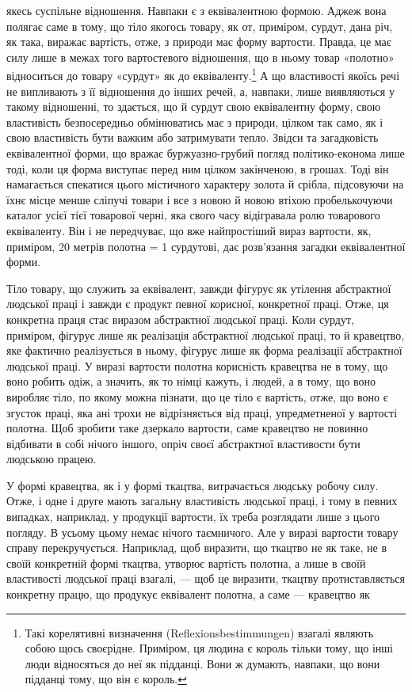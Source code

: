 якесь суспільне відношення. Навпаки є з еквівалентною формою. Аджеж вона полягає саме в тому, що
тіло якогось товару, як от, приміром, сурдут, дана річ, як така, виражає вартість, отже, з природи
має форму вартости. Правда, це має силу лише в межах того вартостевого відношення, що в ньому товар
«полотно» відноситься до товару «сурдут» як до еквіваленту.\footnote{
Такі корелятивні визначення (Reflexionsbestimmungen) взагалі являють собою щось своєрідне.
Приміром, ця людина є король тільки тому, що інші люди відносяться до неї як підданці. Вони ж
думають, навпаки, що вони підданці тому, що він є король.
} А що властивості
якоїсь речі не випливають з її відношення до інших речей, а, навпаки, лише виявляються у такому
відношенні, то здається, що й сурдут свою еквівалентну форму, свою властивість безпосередньо
обмінюватись має з природи, цілком так само, як і свою властивість бути важким або затримувати
тепло. Звідси та загадковість еквівалентної форми, що вражає буржуазно-грубий погляд
політико-економа лише тоді, коли ця форма виступає перед ним цілком закінченою, в грошах. Тоді він
намагається спекатися цього містичного характеру золота й срібла, підсовуючи на їхнє місце менше
сліпучі товари і все з новою й новою втіхою пробелькочуючи каталог усієї тієї товарової черні, яка
свого часу відігравала ролю товарового еквіваленту. Він і не передчуває, що вже найпростіший вираз
вартости, як, приміром, 20 метрів полотна = 1 сурдутові, дає розв’язання загадки еквівалентної
форми.

Тіло товару, що служить за еквівалент, завжди фігурує як утілення абстрактної людської праці і
завжди є продукт певної корисної, конкретної праці. Отже, ця конкретна праця стає виразом
абстрактної людської праці. Коли сурдут, приміром, фігурує лише як реалізація абстрактної людської
праці, то й кравецтво, яке фактично реалізується в ньому, фігурує лише як форма реалізації
абстрактної людської праці. У виразі вартости полотна корисність кравецтва не в тому, що воно робить
одіж, а значить, як то німці кажуть, і людей, а в тому, що воно виробляє тіло, по якому можна
пізнати, що це тіло є вартість, отже, що воно є згусток праці, яка ані трохи не відрізняється від
праці, упредметненої у вартості полотна. Щоб зробити таке дзеркало вартости, саме кравецтво не
повинно відбивати в собі нічого іншого, опріч своєї абстрактної властивости бути людською працею.

У формі кравецтва, як і у формі ткацтва, витрачається людську робочу силу. Отже, і одне і друге
мають загальну властивість людської праці, і тому в певних випадках, наприклад, у продукції
вартости, їх треба розглядати лише з цього погляду. В усьому цьому немає нічого таємничого. Але у
виразі вартости товару справу перекручується. Наприклад, щоб виразити, що ткацтво не як таке, не в
своїй конкретній формі ткацтва, утворює вартість полотна, а лише в своїй властивості людської праці
взагалі, — щоб це виразити, ткацтву протиставляється конкретну працю, що продукує еквівалент
полотна, а саме — кравецтво як